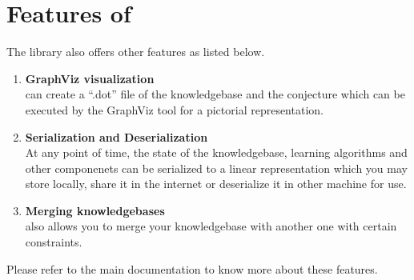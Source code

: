 \section{Features of \libalf}
The library also offers other features as listed below.
\begin{enumerate}
 \item \textbf{GraphViz visualization} \\
       \libalf can create a ``.dot'' file of the knowledgebase and the conjecture which can be executed by the GraphViz tool for a pictorial representation.
 \item \textbf{Serialization and Deserialization} \\
	At any point of time, the state of the knowledgebase, learning algorithms and other componenets can be serialized to a linear representation which you may store locally, share it in the internet or deserialize it in other machine for use.
 \item \textbf{Merging knowledgebases} \\
	\libalf also allows you to merge your knowledgebase with another one with certain constraints.
\end{enumerate}
Please refer to the main documentation to know more about these features.

